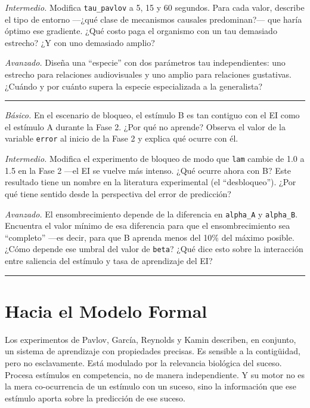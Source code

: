 \documentclass[
  letterpaper,
  DIV=11,
  numbers=noendperiod]{scrreprt}
\begin{document}
\begin{tcolorbox}[enhanced jigsaw, toprule=.15mm, arc=.35mm, colback=white, opacityback=0, colframe=quarto-callout-note-color-frame, breakable, rightrule=.15mm, left=2mm, leftrule=.75mm, bottomrule=.15mm]
\emph{Intermedio.} Modifica \texttt{tau\_pavlov} a 5, 15 y 60 segundos.
Para cada valor, describe el tipo de entorno ---¿qué clase de mecanismos
causales predominan?--- que haría óptimo ese gradiente. ¿Qué costo paga
el organismo con un tau demasiado estrecho? ¿Y con uno demasiado amplio?

\emph{Avanzado.} Diseña una ``especie'' con dos parámetros tau
independientes: uno estrecho para relaciones audiovisuales y uno amplio
para relaciones gustativas. ¿Cuándo y por cuánto supera la especie
especializada a la generalista?

\begin{center}\rule{0.5\linewidth}{0.5pt}\end{center}

\emph{Básico.} En el escenario de bloqueo, el estímulo B es tan contiguo
con el EI como el estímulo A durante la Fase 2. ¿Por qué no aprende?
Observa el valor de la variable \texttt{error} al inicio de la Fase 2 y
explica qué ocurre con él.

\emph{Intermedio.} Modifica el experimento de bloqueo de modo que
\texttt{lam} cambie de 1.0 a 1.5 en la Fase 2 ---el EI se vuelve más
intenso. ¿Qué ocurre ahora con B? Este resultado tiene un nombre en la
literatura experimental (el ``desbloqueo''). ¿Por qué tiene sentido
desde la perspectiva del error de predicción?

\emph{Avanzado.} El ensombrecimiento depende de la diferencia en
\texttt{alpha\_A} y \texttt{alpha\_B}. Encuentra el valor mínimo de esa
diferencia para que el ensombrecimiento sea ``completo'' ---es decir,
para que B aprenda menos del 10\% del máximo posible. ¿Cómo depende ese
umbral del valor de \texttt{beta}? ¿Qué dice esto sobre la interacción
entre saliencia del estímulo y tasa de aprendizaje del EI?

\begin{center}\rule{0.5\linewidth}{0.5pt}\end{center}

\section{Hacia el Modelo Formal}\label{hacia-el-modelo-formal}

Los experimentos de Pavlov, García, Reynolds y Kamin describen, en
conjunto, un sistema de aprendizaje con propiedades precisas. Es
sensible a la contigüidad, pero no esclavamente. Está modulado por la
relevancia biológica del suceso. Procesa estímulos en competencia, no de
manera independiente. Y su motor no es la mera co-ocurrencia de un
estímulo con un suceso, sino la información que ese estímulo aporta
sobre la predicción de ese suceso.


\end{tcolorbox}
\end{document}
